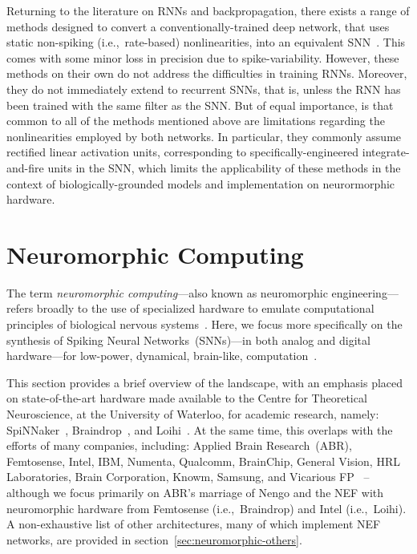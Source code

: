 Returning to the literature on RNNs and backpropagation, there exists a range of methods designed to convert a conventionally-trained deep network, that uses static non-spiking (i.e.,~rate-based) nonlinearities, into an equivalent SNN~\citep[][and various methods mentioned in section~\ref{sec:bptt}]{cao2015spiking, rueckauer2017conversion, yousefzadehconversion2019}.
This comes with some minor loss in precision due to spike-variability.
However, these methods on their own do not address the difficulties in training RNNs.
Moreover, they do not immediately extend to recurrent SNNs, that is, unless the RNN has been trained with the same filter as the SNN.
But of equal importance, is that common to all of the methods mentioned above are limitations regarding the nonlinearities employed by both networks.
In particular, they commonly assume rectified linear activation units, corresponding to specifically-engineered integrate-and-fire units in the SNN, which limits the applicability of these methods in the context of biologically-grounded models and implementation on neurormorphic hardware.

\section{Neuromorphic Computing}
\label{sec:neuromorphic}

The term \emph{neuromorphic computing}---also known as neuromorphic engineering---refers broadly to the use of specialized hardware to emulate computational principles of biological nervous systems~\citep{mead1989analog, liu2002analog}.
Here, we focus more specifically on the synthesis of Spiking Neural Networks~(SNNs)---in both analog and digital hardware---for low-power, dynamical, brain-like, computation~\citep{boahen2017neuromorph}.

This section provides a brief overview of the landscape, with an emphasis placed on state-of-the-art hardware made available to the Centre for Theoretical Neuroscience, at the University of Waterloo, for academic research, namely: SpiNNaker~\citep{furber2014spinnaker}, Braindrop~\citep{braindrop2019}, and Loihi~\citep{davies2018loihi}.
At the same time, this overlaps with the efforts of many companies, including: Applied Brain Research~(ABR), Femtosense, Intel, IBM, Numenta, Qualcomm, BrainChip, General Vision, HRL Laboratories, Brain Corporation, Knowm, Samsung, and Vicarious FP~\citep{marketreport2018, femtosense} -- although we focus primarily on ABR's marriage of Nengo and the NEF with neuromorphic hardware from Femtosense (i.e.,~Braindrop) and Intel (i.e.,~Loihi).
A non-exhaustive list of other architectures, many of which implement NEF networks, are provided in section~\ref{sec:neuromorphic-others}.

